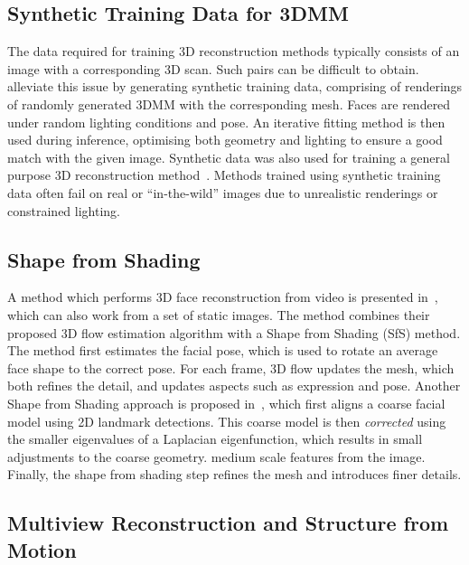 \subsection{Synthetic Training Data for 3DMM}
The data required for training 3D reconstruction methods typically
consists of an image with a corresponding 3D scan. Such pairs can be
difficult to
obtain. \citeauthor{richardson20163d}~\cite{richardson20163d}
alleviate this issue by generating synthetic training data, comprising
of renderings of randomly generated 3DMM with the corresponding
mesh. Faces are rendered under random lighting conditions and pose. An
iterative fitting method is then used during inference, optimising
both geometry and lighting to ensure a good match with the given
image. Synthetic data was also used for training a general purpose 3D
reconstruction method~\cite{li2015joint}. Methods trained using
synthetic training data often fail on real or ``in-the-wild'' images
due to unrealistic renderings or constrained lighting.



\subsection{Shape from Shading}
A method which performs 3D face reconstruction from video is presented
in~\cite{suwajanakorn2014total}, which can also work from a set of
static images. The method combines their proposed 3D flow estimation
algorithm with a Shape from Shading (SfS) method. The method first
estimates the facial pose, which is used to rotate an average face
shape to the correct pose. For each frame, 3D flow updates the mesh,
which both refines the detail, and updates aspects such as expression
and pose. Another Shape from Shading approach is proposed
in~\cite{jiang20183d}, which first aligns a coarse facial model using
2D landmark detections. This coarse model is then \textit{corrected}
using the smaller eigenvalues of a Laplacian eigenfunction, which
results in small adjustments to the coarse geometry.  medium scale
features from the image. Finally, the shape from shading step refines
the mesh and introduces finer details.

\subsection{Multiview Reconstruction and Structure from Motion}

